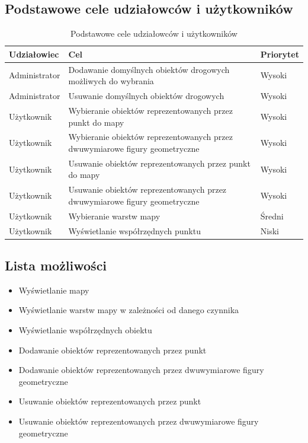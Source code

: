 \newpage
\subsection{Podstawowe cele udziałowców i użytkowników}

\begin{table}[ht]
\centering
\caption{Podstawowe cele udziałowców i użytkowników}
\label{predkosciPromienKrzywizny2}
\begin{tabular}{| l | l | l | }
\hline
\textbf{Udziałowiec} & \textbf{Cel} & \textbf{Priorytet} \\ \hline
Administrator & Dodawanie domyślnych obiektów drogowych możliwych do wybrania & Wysoki\\ \hline
Administrator & Usuwanie domyślnych obiektów drogowych & Wysoki\\ \hline
Użytkownik & Wybieranie obiektów reprezentowanych przez punkt do mapy & Wysoki\\ \hline
Użytkownik & Wybieranie obiektów reprezentowanych przez dwuwymiarowe figury geometryczne & Wysoki\\ \hline
Użytkownik & Usuwanie obiektów reprezentowanych przez punkt do mapy & Wysoki\\ \hline
Użytkownik & Usuwanie obiektów reprezentowanych przez dwuwymiarowe figury geometryczne & Wysoki\\ \hline
Użytkownik & Wybieranie warstw mapy & Średni\\ \hline
Użytkownik & Wyświetlanie współrzędnych punktu & Niski \\ \hline
\end{tabular}
\end{table}


\subsection{Lista możliwości}
\begin{itemize}
\item Wyświetlanie mapy
\item Wyświetlanie warstw mapy w zależności od danego czynnika
\item Wyświetlanie współrzędnych obiektu
\item Dodawanie obiektów reprezentowanych przez punkt 
\item Dodawanie obiektów reprezentowanych przez dwuwymiarowe figury geometryczne
\item Usuwanie obiektów reprezentowanych przez punkt 
\item Usuwanie obiektów reprezentowanych przez dwuwymiarowe figury geometryczne
\end{itemize}


